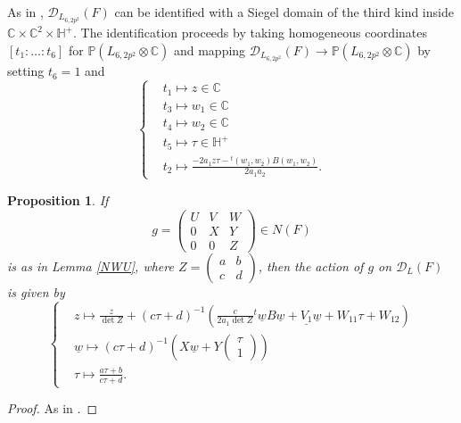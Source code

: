 \documentclass[11pt]{amsart}
\newtheorem{prop}[thm]{Proposition}
\newcommand{\CC}{\mathbb{C}}
\newcommand{\PP}{\mathbb{P}}
\newcommand{\HH}{\mathbb{H}}
\newcommand{\dc}{\mathcal{D}}
\newcommand{\bsm}{\left ( \begin{smallmatrix} }
\newcommand{\esm}{\end{smallmatrix} \right )}
\newcommand{\opn}{\operatorname}
\begin{document}
As in \cite{Kondo}, $\dc_{L_{6,2p^2}}(F)$ can be identified with a Siegel domain of the third kind inside $\CC \times \CC^2 \times \HH^+$.
The identification proceeds by taking homogeneous coordinates $[t_1:\ldots:t_6]$ for $\PP(L_{6,2p^2} \otimes \CC)$ and mapping  $\dc_{L_{6,2p^2}}(F) \rightarrow \PP(L_{6,2p^2} \otimes \CC)$ by setting $t_6=1$ and
\begin{equation}\label{homogdef}
\begin{cases}
& t_1 \mapsto z \in \CC \\ 
& t_3 \mapsto w_1 \in \CC \\
& t_4 \mapsto w_2 \in \CC \\
& t_5 \mapsto \tau \in \HH^+ \\ 
& t_2 \mapsto \frac{  -2 a_1 z \tau - {}^t (w_1, w_2)B(w_1, w_2)}{2 a_1 a_2}.
\end{cases}
\end{equation}
\begin{prop}\label{Naction}
If 
\begin{equation*}
g = 
\begin{pmatrix} 
U & V & W \\ 
0 & X & Y \\ 
0 & 0 & Z 
\end{pmatrix} 
\in N(F)
\end{equation*}
is as in Lemma \ref{NWU}, 
where $Z = \begin{pmatrix} a & b \\ c & d \end{pmatrix}$, then the action of $g$ on $\dc_L(F)$ is given by
\begin{equation*}
\begin{cases}
& z \mapsto \frac{z}{\opn{det} Z} + (c \tau + d)^{-1} \left ( \frac{c}{2 a_1 \opn{det} Z } {}^t \underline{w} B \underline{w} + \underline{V_1} \underline{w} + W_{11} \tau + W_{12} \right ) \\
& \underline{w} \mapsto (c \tau + d)^{-1} \left ( X \underline{w} + Y \bsm \tau \\ 1 \esm \right ) \\
& \tau \mapsto \frac{a \tau + b} {c \tau +d }. 
\end{cases}
\end{equation*}
\end{prop}
\begin{proof}
As in \cite{GHSK3}.
\end{proof}
\end{document}
